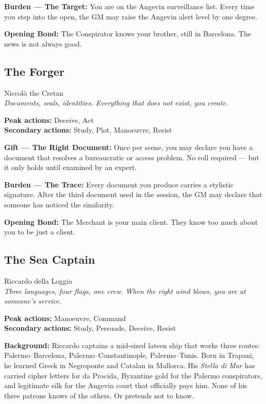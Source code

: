 \textbf{Burden --- The Target:} You are on the Angevin surveillance
list. Every time you step into the open, the GM may raise the Angevin
alert level by one degree.

\textbf{Opening Bond:} The Conspirator knows your brother, still in
Barcelona. The news is not always good.

\filetto

\subsection{The Forger}
{\cinzel\footnotesize\color{grigionote} Niccolò the Cretan}\\
\textit{Documents, seals, identities. Everything that does not exist, you create.}

\textbf{Peak actions:} Deceive, Act\\
\textbf{Secondary actions:} Study, Plot, Manoeuvre, Resist

\textbf{Gift --- The Right Document:} Once per scene, you may declare
you have a document that resolves a bureaucratic or access problem.
No roll required — but it only holds until examined by an expert.

\textbf{Burden --- The Trace:} Every document you produce carries a
stylistic signature. After the third document used in the session,
the GM may declare that someone has noticed the similarity.

\textbf{Opening Bond:} The Merchant is your main client.
They know too much about you to be just a client.

\filetto

\subsection{The Sea Captain}
{\cinzel\footnotesize\color{grigionote} Riccardo della Loggia}\\
\textit{Three languages, four flags, one crew. When the right
wind blows, you are at someone's service.}

\textbf{Peak actions:} Manoeuvre, Command\\
\textbf{Secondary actions:} Study, Persuade, Deceive, Resist

\textbf{Background:} Riccardo captains a mid-sized lateen ship
that works three routes: Palermo--Barcelona,
Palermo--Constantinople, Palermo--Tunis. Born in Trapani, he
learned Greek in Negroponte and Catalan in Mallorca. His
\textit{Stella di Mar} has carried cipher letters for da Procida,
Byzantine gold for the Palermo conspirators, and legitimate silk
for the Angevin court that officially pays him. None of his
three patrons knows of the others. Or pretends not to know.

